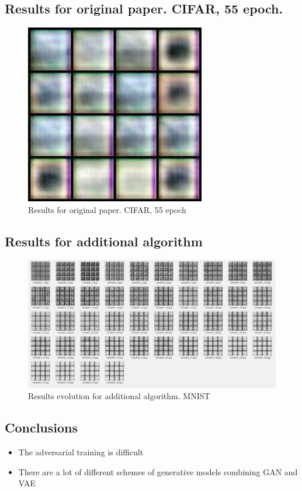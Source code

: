 \documentclass{article}
\begin{document}
    \subsection{Results for original paper. CIFAR, 55 epoch.}
    \begin{figure}[!h]
        \includegraphics[width=0.7\textwidth]{figures/samples_55.jpg}
        \caption{Results for original paper. CIFAR, 55 epoch}
    \end{figure}

    \subsection{Results for additional algorithm}
    \begin{figure}[!h]
        \includegraphics[width=\textwidth]{figures/MNIST-additional-evolution.png}
        \caption{Results evolution for additional algorithm. MNIST}
    \end{figure}

    \subsection{Conclusions}
    \begin{itemize}
        \item The adversarial training is difficult
        \item There are a lot of different schemes of generative models combining GAN and VAE
    \end{itemize}
\end{document}
